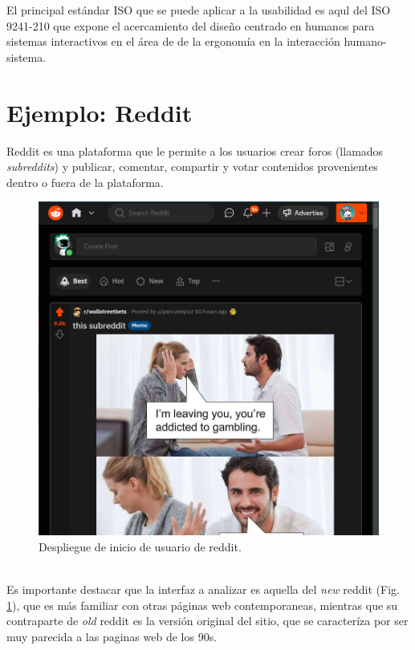 El principal estándar ISO que se puede aplicar a la usabilidad es aqul del ISO 9241-210 %
que expone el acercamiento del diseño centrado en humanos para sistemas interactivos en el área de
de la ergonomía en la interacción humano-sistema. 

\section{Ejemplo: Reddit}
Reddit es una plataforma que le permite a los usuarios crear foros (llamados \emph{subreddits}) y
publicar, comentar, compartir y votar contenidos provenientes dentro o fuera de la plataforma.
\begin{figure}[t]
    \centering
    \includegraphics[scale=0.33]{../images/fig2.png}
    \caption{Despliegue de inicio de usuario de reddit.}
    \label{fig:fig2}    
\end{figure}
\\

Es importante destacar que la interfaz a analizar es aquella del \emph{new} reddit (Fig. \ref{fig:fig2}), que es
más familiar con otras páginas web contemporaneas, mientras que su contraparte de \emph{old}
reddit es la versión original del sitio, que se caracteríza por ser muy parecida a las paginas
web de los 90s.
\\

